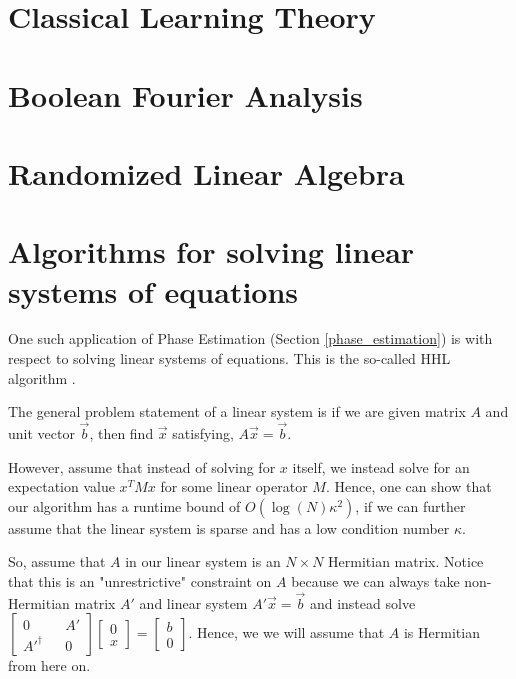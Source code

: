\documentclass[main.tex]{subfiles}
\begin{document}
\section{Classical Learning Theory}

\section{Boolean Fourier Analysis}

\section{Randomized Linear Algebra}

\section{Algorithms for solving linear systems of equations}

One such application of Phase Estimation (Section \ref{phase_estimation}) is with respect to solving linear systems of equations. This is the so-called HHL algorithm \cite{lloyd2010quantum}.

The general problem statement of a linear system is if we are given matrix $A$ and unit vector $\vec{b}$, then find $\vec{x}$ satisfying, $A\vec{x} = \vec{b}$. 

However, assume that instead of solving for $x$ itself, we instead solve for an expectation value $x^T M x$ for some linear operator $M$. Hence, one can show that our algorithm has a runtime bound of $O(\log(N)\kappa ^{2})$, if we can further assume that the linear system is sparse and has a low condition number $\kappa$.

So, assume that $A$ in our linear system is an $N \times N$ Hermitian matrix. Notice that this is an "unrestrictive" constraint on $A$ because we can always take non-Hermitian matrix $A'$ and linear system $A' \vec{x} = \vec{b}$ and instead solve $\begin{bmatrix}
	0 && A' \\ A'^\dag && 0
\end{bmatrix} \begin{bmatrix} 0 \\ x \end{bmatrix} = \begin{bmatrix} b \\ 0 \end{bmatrix}$. Hence, we we will assume that $A$ is Hermitian from here on. 
\end{document}
